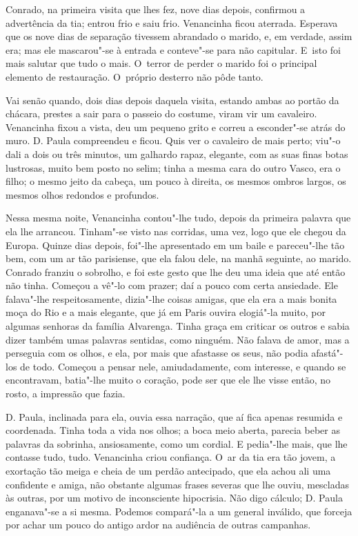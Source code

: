 Conrado, na primeira visita que lhes fez, nove dias depois, confirmou a
advertência da tia; entrou frio e saiu frio. Venancinha ficou aterrada.
Esperava que os nove dias de separação tivessem abrandado o marido, e,
em verdade, assim era; mas ele mascarou"-se à entrada e conteve"-se para
não capitular. E~isto foi mais salutar que tudo o mais. O~terror de
perder o marido foi o principal elemento de restauração. O~próprio
desterro não pôde tanto.

Vai senão quando, dois dias depois daquela visita, estando ambas ao
portão da chácara, prestes a sair para o passeio do costume, viram vir
um cavaleiro. Venancinha fixou a vista, deu um pequeno grito e correu a
esconder"-se atrás do muro. D. Paula compreendeu e ficou. Quis ver o
cavaleiro de mais perto; viu"-o dali a dois ou três minutos, um galhardo
rapaz, elegante, com as suas finas botas lustrosas, muito bem posto no
selim; tinha a mesma cara do outro Vasco, era o filho; o mesmo jeito da
cabeça, um pouco à direita, os mesmos ombros largos, os mesmos olhos
redondos e profundos.

Nessa mesma noite, Venancinha contou"-lhe tudo, depois da primeira
palavra que ela lhe arrancou. Tinham"-se visto nas corridas, uma vez,
logo que ele chegou da Europa. Quinze dias depois, foi"-lhe apresentado
em um baile e pareceu"-lhe tão bem, com um ar tão parisiense, que ela
falou dele, na manhã seguinte, ao marido. Conrado franziu o sobrolho, e
foi este gesto que lhe deu uma ideia que até então não tinha. Começou a
vê"-lo com prazer; daí a pouco com certa ansiedade. Ele falava"-lhe
respeitosamente, dizia"-lhe coisas amigas, que ela era a mais bonita moça
do Rio e a mais elegante, que já em Paris ouvira elogiá"-la muito, por
algumas senhoras da família Alvarenga. Tinha graça em criticar os outros
e sabia dizer também umas palavras sentidas, como ninguém. Não falava de
amor, mas a perseguia com os olhos, e ela, por mais que afastasse os
seus, não podia afastá"-los de todo. Começou a pensar nele,
amiudadamente, com interesse, e quando se encontravam, batia"-lhe muito o
coração, pode ser que ele lhe visse então, no rosto, a impressão que
fazia.

D. Paula, inclinada para ela, ouvia essa narração, que aí fica apenas
resumida e coordenada. Tinha toda a vida nos olhos; a boca meio aberta,
parecia beber as palavras da sobrinha, ansiosamente, como um cordial. E
pedia"-lhe mais, que lhe contasse tudo, tudo. Venancinha criou confiança.
O~ar da tia era tão jovem, a exortação tão meiga e cheia de um perdão
antecipado, que ela achou ali uma confidente e amiga, não obstante
algumas frases severas que lhe ouviu, mescladas às outras, por um motivo
de inconsciente hipocrisia. Não digo cálculo; D. Paula enganava"-se a si
mesma. Podemos compará"-la a um general inválido, que forceja por achar
um pouco do antigo ardor na audiência de outras campanhas.

